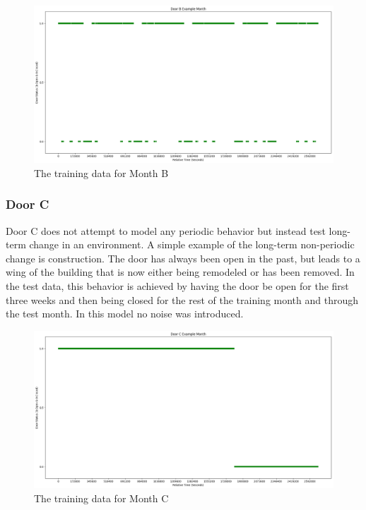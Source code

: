   \begin{figure}[!htb]
    \centering
    \includegraphics[width=\linewidth]{images/Door_B_Example_Month.png}
    \caption{The training data for Month B}
    \label{figure:Door B Training Month}
  \end{figure}

  \subsubsection{ Door C }

  Door C does not attempt to model any periodic behavior but instead test
  long-term change in an environment. A simple example of the long-term
  non-periodic change is construction. The door has always been
  open in the past, but leads to a wing of the building that is now either
  being remodeled or has been removed. In the test data, this behavior is
  achieved by having the door be open for the first three weeks and then being
  closed for the rest of the training month and through the test month. In
  this model no noise was introduced. \\

  \begin{figure}[!htb]
    \centering
    \includegraphics[width=\linewidth]{images/Door_C_Example_Month.png}
    \caption{The training data for Month C}
    \label{figure:Door C Training Month}
  \end{figure}


